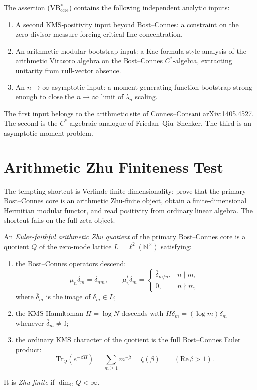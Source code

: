 \begin{remark}
\label{v4-arith:vb:rem:proof-strategy}
The assertion (VB\(^{*}_{\mathrm{core}}\)) contains the following
independent analytic inputs:
\begin{enumerate}
\item A second KMS-positivity input beyond Bost--Connes: a constraint
on the zero-divisor measure forcing critical-line concentration.
\item An arithmetic-modular bootstrap input: a Kac-formula-style
analysis of the arithmetic Virasoro algebra on the Bost--Connes
\(C^{*}\)-algebra, extracting unitarity from null-vector absence.
\item An \(n\to\infty\) asymptotic input: a moment-generating-function
bootstrap strong enough to close the \(n\to\infty\) limit of
\(\lambda_{n}\) scaling.
\end{enumerate}
The first input belongs to the arithmetic site of Connes--Consani
arXiv:1405.4527. The second is the \(C^{*}\)-algebraic analogue of
Friedan--Qiu--Shenker. The third is an asymptotic moment problem.
\end{remark}

\section{Arithmetic Zhu Finiteness Test}
\label{v4-arith:vb:zhu-finiteness-test}

The tempting shortcut is Verlinde finite-dimensionality: prove that the
primary Bost--Connes core is an arithmetic Zhu-finite object, obtain a
finite-dimensional Hermitian modular functor, and read positivity from
ordinary linear algebra. The shortcut fails on the full zeta object.

\begin{definition}
\label{v4-arith:vb:def:euler-faithful-zhu}
An \emph{Euler-faithful arithmetic Zhu
quotient} of the primary Bost--Connes core is a quotient \(Q\) of the
zero-mode lattice \(L=\ell^{2}(\mathbb{N}^{\times})\) satisfying:
\begin{enumerate}
\item the Bost--Connes operators descend:
\[
\mu_{n}\overline{\delta}_{m}=\overline{\delta}_{nm},\qquad
\mu_{n}^{*}\overline{\delta}_{m}=
\begin{cases}
\overline{\delta}_{m/n},& n\mid m,\\
0,& n\nmid m,
\end{cases}
\]
where \(\overline{\delta}_{m}\) is the image of
\(\delta_{m}\in L\);
\item the KMS Hamiltonian \(H=\log N\) descends with
\(H\overline{\delta}_{m}=(\log m)\overline{\delta}_{m}\) whenever
\(\overline{\delta}_{m}\neq0\);
\item the ordinary KMS character of the quotient is the full
Bost--Connes Euler product:
\[
\mathrm{Tr}_{Q}(e^{-\beta H})=\sum_{m\geq1}m^{-\beta}=\zeta(\beta)
\qquad(\mathrm{Re}\,\beta>1).
\]
\end{enumerate}
It is \emph{Zhu finite} if \(\dim_{\mathbb C}Q<\infty\).
\end{definition}

